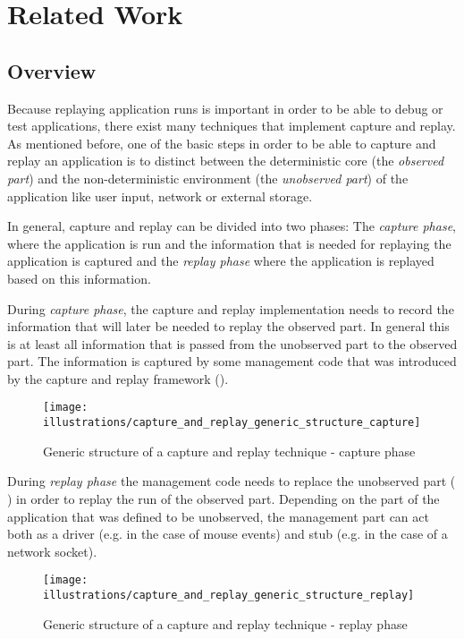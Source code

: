 \chapter{Related Work}
\section{Overview}
Because replaying application runs is important in order to be able to debug or test applications, there exist many techniques that implement capture and replay. As mentioned before, one of the basic steps in order to be able to capture and replay an application is to distinct between the deterministic core (the \emph{observed part}) and the non-deterministic environment (the \emph{unobserved part}) of the application like user input, network or external storage.

In general, capture and replay can be divided into two phases: The \emph{capture phase}, where the application is run and the information that is needed for replaying the application is captured and the \emph{replay phase} where the application is replayed based on this information.

During \emph{capture phase}, the capture and replay implementation needs to record the information that will later be needed to replay the observed part. In general this is at least all information that is passed from the unobserved part to the observed part. The information is captured by some management code that was introduced by the capture and replay framework ().
\begin{figure}[h]
  \centering
  \texttt{[image: illustrations/capture\_and\_replay\_generic\_structure\_capture]}
  \caption{Generic structure of a capture and replay technique - capture phase}
  \label{fig:GenericCrStructure_capture}
\end{figure}

During \emph{replay phase} the management code needs to replace the unobserved part ( 
) in order to replay the run of the observed part. Depending on the part of the application that was defined to be unobserved, the management part can act both as a driver (e.g. in the case of mouse events) and stub (e.g. in the case of a network socket). 
\begin{figure}[h]
  \centering
  \texttt{[image: illustrations/capture\_and\_replay\_generic\_structure\_replay]}
  \caption{Generic structure of a capture and replay technique - replay phase}
  \label{fig:GenericCrStructure_replay}
\end{figure}

